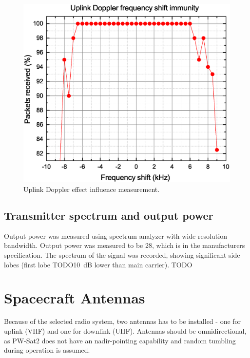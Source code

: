 \begin{figure}[H]
    \centering
    \includegraphics[width=0.6\paperwidth]{img/4/uplink_doppler.eps}
    \caption{Uplink Doppler effect influence measurement.}
    \label{4_uplink_doppler_measurement}
\end{figure}


\subsection{Transmitter spectrum and output power}
Output power was measured using spectrum analyzer with wide resolution bandwidth. Output power was measured to be \SI{28}{\dBm}, which is in the manufacturers specification.
The spectrum of the signal was recorded, showing significant side lobes (first lobe TODO\SI{10}{\dB} lower than main carrier).
TODO








\section{Spacecraft Antennas}
Because of the selected radio system, two antennas has to be installed - one for uplink (VHF) and one for downlink (UHF). Antennas should be omnidirectional, as PW-Sat2 does not have an nadir-pointing capability and random tumbling during operation is assumed.

